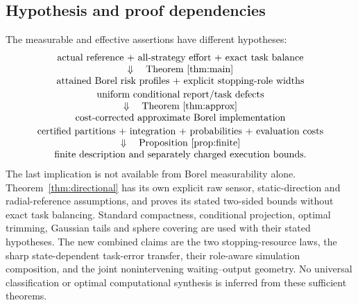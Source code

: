 \subsection*{Hypothesis and proof dependencies}
The measurable and effective assertions have different hypotheses:
\[
\begin{array}{c}
 \text{actual reference + all-strategy effort + exact task balance}\\
 \Downarrow\quad\text{Theorem~\ref{thm:main}}\\
 \text{attained Borel risk profiles + explicit stopping-role widths}\\[2pt]
 \text{uniform conditional report/task defects}\\
 \Downarrow\quad\text{Theorem~\ref{thm:approx}}\\
 \text{cost-corrected approximate Borel implementation}\\[2pt]
 \text{certified partitions + integration + probabilities + evaluation costs}\\
 \Downarrow\quad\text{Proposition~\ref{prop:finite}}\\
 \text{finite description and separately charged execution bounds}.
\end{array}
\]
The last implication is not available from Borel measurability alone. Theorem~\ref{thm:directional} has its own explicit raw sensor, static-direction and radial-reference assumptions, and proves its stated two-sided bounds without exact task balancing. Standard compactness, conditional projection, optimal trimming, Gaussian tails and sphere covering are used with their stated hypotheses. The new combined claims are the two stopping-resource laws, the sharp state-dependent task-error transfer, their role-aware simulation composition, and the joint nonintervening waiting--output geometry. No universal classification or optimal computational synthesis is inferred from these sufficient theorems.
